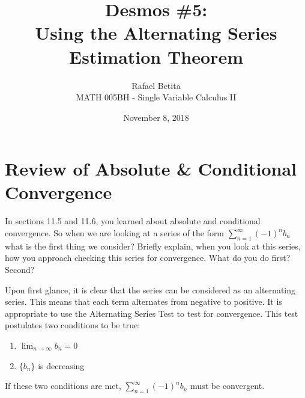 \documentclass[12pt]{article}
\title{Desmos \#5:
\\Using the Alternating Series
\\Estimation Theorem}
\author{Rafael Betita\\
MATH 005BH - Single Variable Calculus II}
\date{November 8, 2018}
\begin{document}
\maketitle
\newpage
\section{Review of Absolute \& Conditional\\ Convergence}
In sections 11.5 and 11.6, you learned about absolute and conditional convergence. So when we are looking at a series of the form $\sum_{n=1}^\infty(-1)^nb_n$ what is the first thing we consider? Briefly explain, when you look at this series, how you approach checking this series for convergence. What do you do first? Second?


\vspace{5mm}
\noindent Upon first glance, it is clear that the series can be considered as an alternating series. This means that each term alternates from negative to positive. It is appropriate to use the Alternating Series Test to test for convergence. This test postulates two conditions to be true:

\begin{enumerate}
    \item $\lim_{n\to\infty}b_n = 0$
    \item $\{b_n\}$ is decreasing
\end{enumerate}
\noindent If these two conditions are met, $\sum_{n=1}^\infty(-1)^nb_n$ must be convergent.
\end{document}
